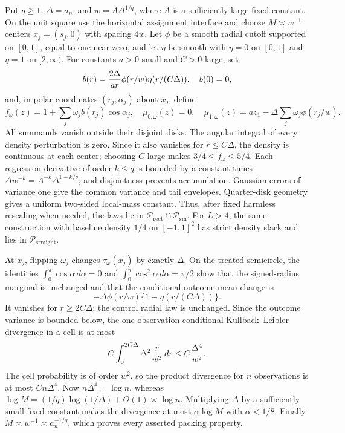 Put \(q\geq1\), \(\Delta=a_n\), and \(w=A\Delta^{1/q}\), where \(A\) is a sufficiently large fixed constant.  On the unit square use the horizontal assignment interface and choose \(M\asymp w^{-1}\) centers \(x_j=(s_j,0)\) with spacing \(4w\).  Let \(\phi\) be a smooth radial cutoff supported on \([0,1]\), equal to one near zero, and let \(\eta\) be smooth with \(\eta=0\) on \([0,1]\) and \(\eta=1\) on \([2,\infty)\).  For constants \(a>0\) small and \(C>0\) large, set
\[
 b(r)={2\Delta\over ar}\phi(r/w)\eta(r/(C\Delta)),\quad b(0)=0,
\]
and, in polar coordinates \((r_j,\alpha_j)\) about \(x_j\), define
\[
 f_\omega(z)=1+\sum_j\omega_j b(r_j)\cos\alpha_j,
 \quad \mu_{0,\omega}(z)=0,
 \quad \mu_{1,\omega}(z)=az_1-\Delta\sum_j\omega_j\phi(r_j/w).
\]
All summands vanish outside their disjoint disks.  The angular integral of every density perturbation is zero.  Since it also vanishes for \(r\leq C\Delta\), the density is continuous at each center; choosing \(C\) large makes \(3/4\leq f_\omega\leq5/4\).  Each regression derivative of order \(k\leq q\) is bounded by a constant times \(\Delta w^{-k}=A^{-k}\Delta^{1-k/q}\), and disjointness prevents accumulation.  Gaussian errors of variance one give the common variance and tail envelopes.  Quarter-disk geometry gives a uniform two-sided local-mass constant.  Thus, after fixed harmless rescaling when needed, the laws lie in \(\mathcal P_{\mathrm{rect}}\cap\mathcal P_{\mathrm{sm}}\).  For \(L>4\), the same construction with baseline density \(1/4\) on \([-1,1]^2\) has strict density slack and lies in \(\mathcal P_{\mathrm{straight}}\).

At \(x_j\), flipping \(\omega_j\) changes \(\tau_\omega(x_j)\) by exactly \(\Delta\).  On the treated semicircle, the identities \(\int_0^\pi\cos\alpha\,d\alpha=0\) and \(\int_0^\pi\cos^2\alpha\,d\alpha=\pi/2\) show that the signed-radius marginal is unchanged and that the conditional outcome-mean change is
\[
 -\Delta\phi(r/w)\{1-\eta(r/(C\Delta))\}.
\]
It vanishes for \(r\geq2C\Delta\); the control radial law is unchanged.  Since the outcome variance is bounded below, the one-observation conditional Kullback--Leibler divergence in a cell is at most
\[
 C\int_0^{2C\Delta}\Delta^2{r\over w^2}\,dr
 \leq C{\Delta^4\over w^2}.
\]
The cell probability is of order \(w^2\), so the product divergence for \(n\) observations is at most \(Cn\Delta^4\).  Now \(n\Delta^4=\log n\), whereas \(\log M=(1/q)\log(1/\Delta)+O(1)\asymp\log n\).  Multiplying \(\Delta\) by a sufficiently small fixed constant makes the divergence at most \(\alpha\log M\) with \(\alpha<1/8\).  Finally \(M\asymp w^{-1}\asymp a_n^{-1/q}\), which proves every asserted packing property.